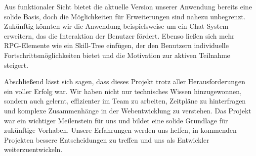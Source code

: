 \documentclass[a4paper,12pt]{article}
\begin{document}
Aus funktionaler Sicht bietet die aktuelle Version unserer Anwendung bereits
eine solide Basis, doch die Möglichkeiten für Erweiterungen sind nahezu
unbegrenzt. Zukünftig könnten wir die Anwendung beispielsweise um ein
Chat-System erweitern, das die Interaktion der Benutzer fördert. Ebenso ließen
sich mehr RPG-Elemente wie ein Skill-Tree einfügen, der den Benutzern
individuelle Fortschrittsmöglichkeiten bietet und die Motivation zur aktiven
Teilnahme steigert.

Abschließend lässt sich sagen, dass dieses Projekt trotz aller
Herausforderungen ein voller Erfolg war. Wir haben nicht nur technisches Wissen
hinzugewonnen, sondern auch gelernt, effizienter im Team zu arbeiten, Zeitpläne
zu hinterfragen und komplexe Zusammenhänge in der Webentwicklung zu verstehen.
Das Projekt war ein wichtiger Meilenstein für uns und bildet eine solide
Grundlage für zukünftige Vorhaben. Unsere Erfahrungen werden uns helfen, in
kommenden Projekten bessere Entscheidungen zu treffen und uns als Entwickler
weiterzuentwickeln.

\newpage
\printbibliography
\end{document}
